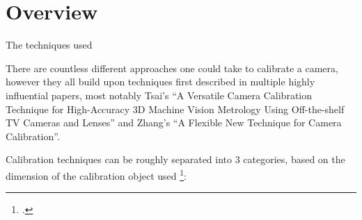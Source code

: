 \section{Overview}

The techniques used 

There are countless different approaches one could take to calibrate a camera, however they all build upon techniques first described in multiple highly influential papers, most notably Tsai's ``A Versatile Camera Calibration Technique for High-Accuracy 3D Machine Vision Metrology Using Off-the-shelf TV Cameras and Lenses'' and Zhang's ``A Flexible New Technique for Camera Calibration''. 



Calibration techniques can be roughly separated into 3 categories, based on the dimension of the calibration object used \footcite{zhangCameraCalibration2007}:




